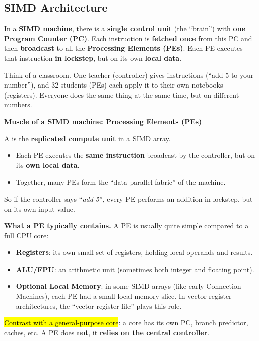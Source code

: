 \subsection{SIMD Architecture}

In a \textbf{SIMD machine}, there is a \textbf{single control unit} (the ``brain'') with \textbf{one Program Counter (PC)}. Each instruction is \textbf{fetched once} from this PC and then \textbf{broadcast} to all the \textbf{Processing Elements (PEs)}. Each PE executes that instruction \textbf{in lockstep}, but on its own \textbf{local data}.

\begin{examplebox}[: Analogy]
    Think of a classroom. One teacher (controller) gives instructions (``add 5 to your number''), and 32 students (PEs) each apply it to their own notebooks (registers). Everyone does the same thing at the same time, but on different numbers.
\end{examplebox}

\begin{flushleft}
    \textcolor{Green3}{ \textbf{Muscle of a SIMD machine: Processing Elements (PEs)}}
\end{flushleft}
A  is the \textbf{replicated compute unit} in a SIMD array.
\begin{itemize}
    \item Each PE executes the \textbf{same instruction} broadcast by the controller, but on its \textbf{own local data}.
    \item Together, many PEs form the ``data-parallel fabric'' of the machine.
\end{itemize}
So if the controller says ``\emph{add 5}'', every PE performs an addition in lockstep, but on its own input value.

\highspace
\textcolor{Green3}{ \textbf{What a PE typically contains.}} A PE is usually quite simple compared to a full CPU core:
\begin{itemize}
    \item \textbf{Registers}: its own small set of registers, holding local operands and results.
    \item \textbf{ALU/FPU}: an arithmetic unit (sometimes both integer and floating point).
    \item \textbf{Optional Local Memory}: in some SIMD arrays (like early Connection Machines), each PE had a small local memory slice. In vector-register architectures, the ``vector register file'' plays this role.
\end{itemize}
\hl{Contrast with a general-purpose core}: a core has its own PC, branch predictor, caches, etc. A PE does \textbf{not}, it \textbf{relies on the central controller}.

